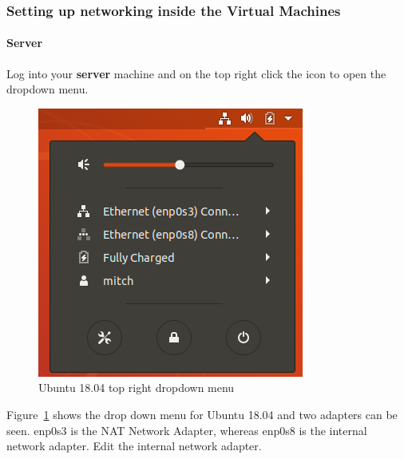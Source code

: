 \documentclass[12pt]{article}
\begin{document}
\subsubsection{Setting up networking inside the Virtual Machines}

\paragraph{Server}

    Log into your \textbf{server} machine and on the top right click the icon to open the dropdown menu. 
    \begin{figure}[H]
        \begin{center}
            \includegraphics[scale=0.5]{setting_up_server_1.png}
        \end{center}{}
        \caption{Ubuntu 18.04 top right dropdown menu}
        \label{fig:setting_up_server_1}
    \end{figure}
    
    Figure~\ref{fig:setting_up_server_1} shows the drop down menu for Ubuntu 18.04 and two adapters can be seen. enp0s3 is the NAT Network Adapter, whereas enp0s8 is the internal network adapter. Edit the internal network adapter.
    
\end{document}

